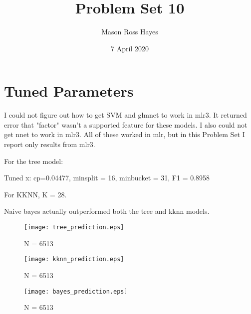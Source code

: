 \documentclass{article}
\title{Problem Set 10}
\author{Mason Ross Hayes}
\date{7 April 2020}
\begin{document}
\maketitle

\section{Tuned Parameters}

I could not figure out how to get SVM and glmnet to work in mlr3. It returned error that "factor" wasn't a supported feature for these models.
I also could not get nnet to work in mlr3. All of these worked in mlr, but in this Problem Set I report only results from mlr3.

For the tree model: 

Tuned x: cp=0.04477, minsplit = 16, minbucket = 31, F1 = 0.8958 

For KKNN, K = 28. 

Naive bayes actually outperformed both the tree and kknn models.



\begin{figure}
    \centering
    \texttt{[image: tree\_prediction.eps]}
    \caption{N = 6513}
    \label{fig:my_label}
\end{figure}

\begin{figure}
    \centering
    \texttt{[image: kknn\_prediction.eps]}
    \caption{N = 6513}
    \label{fig:my_label}
\end{figure}

\begin{figure}
    \centering
    \texttt{[image: bayes\_prediction.eps]}
    \caption{N = 6513}
    \label{fig:my_label}
\end{figure}
\end{document}
